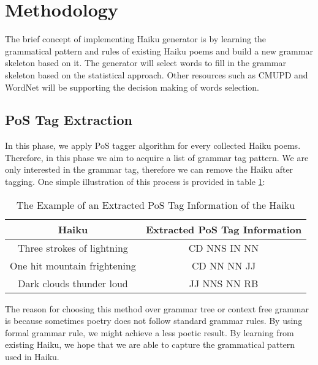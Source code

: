 

\section{Methodology}


The brief concept of implementing Haiku generator is by learning the grammatical pattern and rules of existing Haiku poems and build a new grammar skeleton based on it. The generator will select words to fill in the grammar skeleton based on the statistical approach. Other resources such as CMUPD and WordNet will be supporting the decision making of words selection.


\subsection{PoS Tag Extraction}


In this phase, we apply PoS tagger algorithm for every collected Haiku poems. Therefore, in this phase we aim to acquire a list of grammar tag pattern. We are only interested in the grammar tag, therefore we can remove the Haiku after tagging. One simple illustration of this process is provided in table \ref{exmpl}:


\begin{table}[h]

\centering

\begin{tabular}{|c|c|}

\hline Haiku & Extracted PoS Tag Information \\

\hline Three strokes of lightning & CD NNS IN NN \\ 

One hit mountain frightening &  CD NN NN JJ  \\ 

Dark clouds thunder loud &  JJ NNS NN RB \\ 

\hline

\end{tabular} 

\caption{The Example of an Extracted PoS Tag Information of the Haiku \cite{HaikuThunder}}

\label{exmpl}

\end{table}


The reason for choosing this method over grammar tree or context free grammar is because sometimes poetry does not follow standard grammar rules. By using formal grammar rule, we might achieve a less poetic result. By learning from existing Haiku, we hope that we are able to capture the grammatical pattern used in Haiku.


